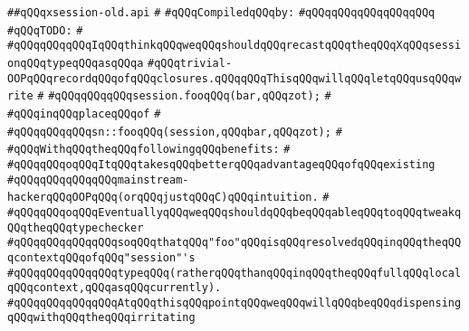 \label{src/lib/x-kit/xclient/src/window/xsession-old.api}
\verb|##qQQqxsession-old.api|\newline
\verb|#|\newline
\newline
\verb|#qQQqCompiledqQQqby:|\newline
\verb|#qQQqqQQqqQQqqQQqqQQq|\newline
\newline
\newline
\verb|#qQQqTODO:|\newline
\verb|#|\newline
\verb|#qQQqqQQqqQQqIqQQqthinkqQQqweqQQqshouldqQQqrecastqQQqtheqQQqXqQQqsessionqQQqtypeqQQqasqQQqa|\newline
\verb|#qQQqtrivial-OOPqQQqrecordqQQqofqQQqclosures.qQQqqQQqThisqQQqwillqQQqletqQQqusqQQqwrite|\newline
\verb|#|\newline
\verb|#qQQqqQQqqQQqsession.fooqQQq(bar,qQQqzot);|\newline
\verb|#|\newline
\verb|#qQQqinqQQqplaceqQQqof|\newline
\verb|#|\newline
\verb|#qQQqqQQqqQQqsn::fooqQQq(session,qQQqbar,qQQqzot);|\newline
\verb|#|\newline
\verb|#qQQqWithqQQqtheqQQqfollowingqQQqbenefits:|\newline
\verb|#|\newline
\verb|#qQQqqQQqoqQQqItqQQqtakesqQQqbetterqQQqadvantageqQQqofqQQqexisting|\newline
\verb|#qQQqqQQqqQQqqQQqmainstream-hackerqQQqOOPqQQq(orqQQqjustqQQqC)qQQqintuition.|\newline
\verb|#|\newline
\verb|#qQQqqQQqoqQQqEventuallyqQQqweqQQqshouldqQQqbeqQQqableqQQqtoqQQqtweakqQQqtheqQQqtypechecker|\newline
\verb|#qQQqqQQqqQQqqQQqsoqQQqthatqQQq"foo"qQQqisqQQqresolvedqQQqinqQQqtheqQQqcontextqQQqofqQQq"session"'s|\newline
\verb|#qQQqqQQqqQQqqQQqtypeqQQq(ratherqQQqthanqQQqinqQQqtheqQQqfullqQQqlocalqQQqcontext,qQQqasqQQqcurrently).|\newline
\verb|#qQQqqQQqqQQqqQQqAtqQQqthisqQQqpointqQQqweqQQqwillqQQqbeqQQqdispensingqQQqwithqQQqtheqQQqirritating|\newline
